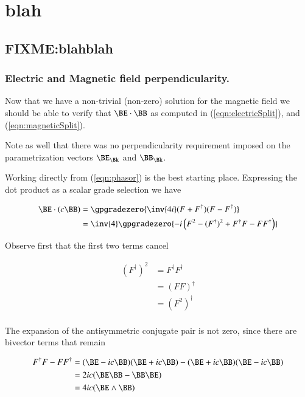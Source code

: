 %

\chapter{blah}
\label{chap:}
\date{July XX, 2009}

\beginArtWithToc

\section{FIXME:blahblah}
\subsection{Electric and Magnetic field perpendicularity.}

Now that we have a non-trivial (non-zero) solution for the magnetic field we should be able to verify that $\BE \cdot \BB$ as computed in (\ref{eqn:electricSplit}), and (\ref{eqn:magneticSplit}).

Note as well that there was no perpendicularity requirement imposed on the parametrization vectors $\BE_\Bk$ and $\BB_\Bk$.  

Working directly from (\ref{eqn:phasor}) is the best starting place.  Expressing the dot product as a scalar grade selection we have

\begin{align*}
\BE \cdot (c \BB) 
&=
\gpgradezero{
\inv{4i}(F + F^\dagger) (F - F^\dagger)
} \\
&=
\inv{4} \gpgradezero{
-i \left( F^2 - (F^\dagger)^2 + F^\dagger F - F F^\dagger \right) } \\
\end{align*}

Observe first that the first two terms cancel

\begin{align*}
(F^\dagger)^2  
&=
F^\dagger F^\dagger \\
&=
(F F)^\dagger \\
&=
(F^2)^\dagger \\
\end{align*}

The expansion of the antisymmetric conjugate pair is not zero, since there
are bivector terms that remain

\begin{align*}
F^\dagger F - F F^\dagger 
&=
(\BE - i c \BB)(\BE + i c \BB) - (\BE + i c \BB)(\BE - i c \BB) \\
&=
2 i c (\BE \BB - \BB \BE) \\
&=
4 i c (\BE \wedge \BB)
\end{align*}

